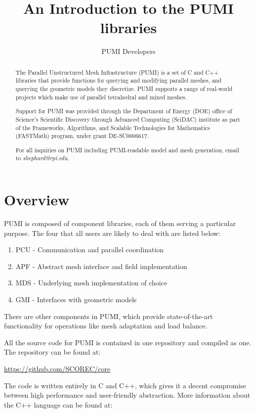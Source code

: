 \documentclass{article}
\author{PUMI Developers}
\title{An Introduction to the PUMI libraries}
\begin{document}
\maketitle

\begin{abstract}
The Parallel Unstructured Mesh Infrastructure (PUMI) is
a set of C and C++ libraries that provide
functions for querying and modifying parallel meshes, and
querying the geometric models they discretize.
PUMI supports a range of real-world projects
which make use of parallel tetrahedral and
mixed meshes.

Support for PUMI was provided through the Department of Energy (DOE) office of Science's Scientific
Discovery through Advanced Computing (SciDAC) institute as part of the Frameworks, Algorithms, and Scalable Technologies for Mathematics (FASTMath) program, under grant DE-SC$0006617$.

For all inquiries on PUMI including PUMI-readable model and mesh generation, email to \emph{shephard@rpi.edu}.
\end{abstract}

\section{Overview}
PUMI is composed of component libraries, each of
them serving a particular purpose.
The four that all users are likely to deal with
are listed below:

\begin{enumerate}
\item PCU - Communication and parallel coordination
\item APF - Abstract mesh interface and field implementation
\item MDS - Underlying mesh implementation of choice
\item GMI - Interfaces with geometric models
\end{enumerate}

There are other components in PUMI, which provide
state-of-the-art functionality for operations like
mesh adaptation and load balance.

All the source code for PUMI is contained in one
repository and compiled as one.
The repository can be found at:

\url{https://github.com/SCOREC/core}

The code is written entirely in C and C++, which
gives it a decent compromise between high performance
and user-friendly abstraction.
More information about the C++ language can be found at:
\end{document}
